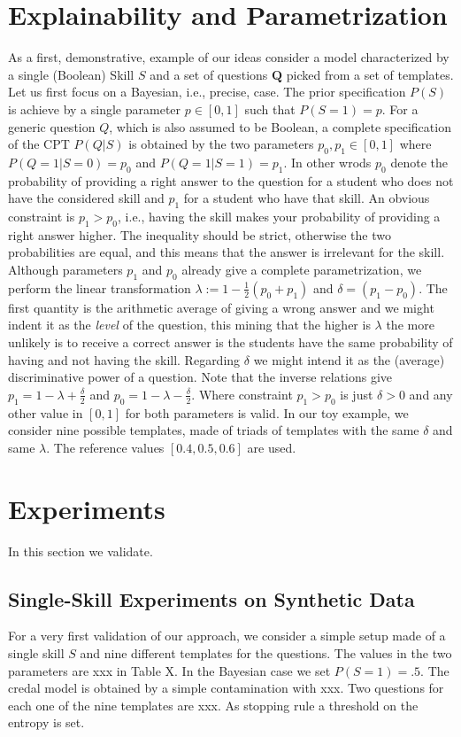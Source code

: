 \documentclass[runningheads]{llncs}
\begin{document}
\section{Explainability and Parametrization}
As a first, demonstrative, example of our ideas consider a model characterized by a single (Boolean) Skill $S$ and a set of questions $\bm{Q}$ picked from a set of templates. Let us first focus on a Bayesian, i.e., precise, case. The prior specification $P(S)$ is achieve by a single parameter $p \in [0,1]$ such that $P(S=1)=p$. For a generic question $Q$, which is also assumed to be Boolean, a complete specification of the CPT $P(Q|S)$ is obtained by the two parameters $p_0,p_1\in [0,1]$ where $P(Q=1|S=0)=p_0$ and $P(Q=1|S=1)=p_1$. In other wrods $p_0$ denote the probability of providing a right answer to the question for a student who does not have the considered skill and $p_1$ for a student who have that skill. An obvious constraint is $p_1>p_0$, i.e., having the skill makes your probability of providing a right answer higher. The inequality should be strict, otherwise the two probabilities are equal, and this means that the answer is irrelevant for the skill. Although parameters $p_1$ and $p_0$ already give a complete parametrization, we perform the linear transformation
$\lambda:=1-\frac{1}{2}(p_0+p_1)$ and $\delta=(p_1-p_0)$. The first quantity is the arithmetic average of giving a wrong answer and we might indent it as the \emph{level} of the question, this mining that the higher is $\lambda$ the more unlikely is to receive a correct answer is the students have the same probability of having and not having the skill. Regarding $\delta$ we might intend it as the (average) discriminative power of a question.
Note that the inverse relations give $p_1=1-\lambda+\frac{\delta}{2}$
and $p_0=1-\lambda-\frac{\delta}{2}$. Where constraint $p_1>p_0$ is just $\delta>0$ and any other value in $[0,1]$ for both parameters is valid.
In our toy example, we consider nine possible templates, made of triads of templates with the same $\delta$ and same $\lambda$. The reference values $[0.4,0.5,0.6]$ are used.

\section{Experiments}\label{sec:exp}
In this section we validate.
\subsection{Single-Skill Experiments on Synthetic Data}
For a very first validation of our approach, we consider a simple setup made of a single skill $S$ and nine different templates for the questions. The values in the two parameters are xxx in Table X. In the Bayesian case we set $P(S=1)=.5$. The credal model is obtained by a simple contamination with xxx. Two questions for each one of the nine templates are xxx. As stopping rule a threshold on the entropy is set.
\end{document}
